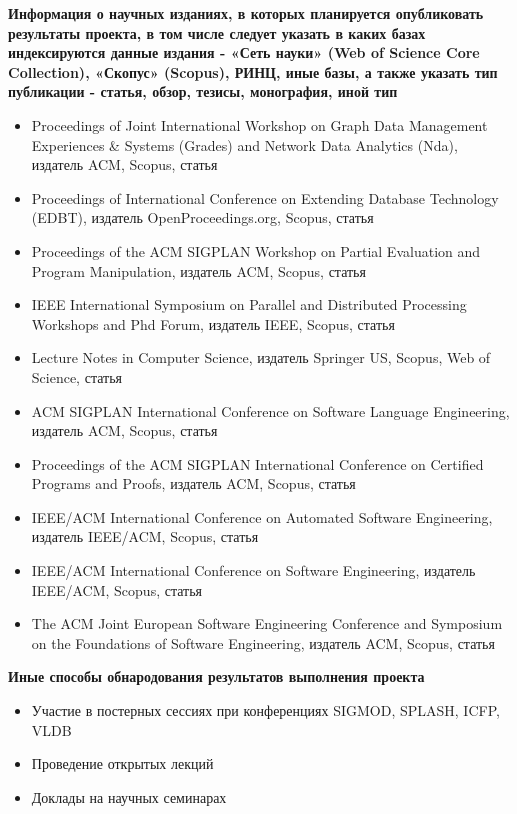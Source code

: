 \documentclass[12pt]{article}  %
\theoremstyle{remark}
\begin{document}
\textbf{Информация о научных изданиях, в которых планируется опубликовать результаты проекта, в том числе следует указать в каких базах индексируются данные издания - «Сеть науки» (Web of Science Core Collection), «Скопус» (Scopus), РИНЦ, иные базы, а также указать тип публикации - статья, обзор, тезисы, монография, иной тип}
\begin{itemize}
  \item Proceedings of Joint International Workshop on Graph Data Management Experiences \& Systems (Grades) and Network Data Analytics (Nda), издатель  ACM, Scopus, статья
  \item Proceedings of International Conference on Extending Database Technology (EDBT), издатель OpenProceedings.org, Scopus, статья
  \item Proceedings of the ACM SIGPLAN Workshop on Partial Evaluation and Program Manipulation, издатель  ACM, Scopus, статья
  \item IEEE International Symposium on Parallel and Distributed Processing Workshops and Phd Forum, издатель  IEEE, Scopus, статья
  \item Lecture Notes in Computer Science, издатель Springer US, Scopus, Web of Science, статья
  \item ACM SIGPLAN International Conference on Software Language Engineering, издатель  ACM, Scopus, статья
  \item Proceedings of the ACM SIGPLAN International Conference on Certified Programs and Proofs, издатель ACM, Scopus, статья
  \item IEEE/ACM International Conference on Automated Software Engineering, издатель IEEE/ACM, Scopus, статья
  \item IEEE/ACM International Conference on Software Engineering, издатель IEEE/ACM, Scopus, статья
  \item The ACM Joint European Software Engineering Conference and Symposium on the Foundations of Software Engineering, издатель ACM, Scopus, статья
  
  
  
  
\end{itemize}

\textbf{Иные способы обнародования результатов выполнения проекта}
\begin{itemize}
\item Участие в постерных сессиях при конференциях SIGMOD, SPLASH, ICFP, VLDB
\item Проведение открытых лекций
\item Доклады на научных семинарах
\end{itemize}
\end{document}
